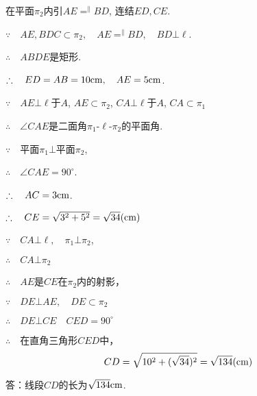 \begin{solution}
  在平面$\pi_2$内引$AE\displaystyle\mathop{=}^{\parallel}BD$, 连结$ED,CE$.

$\because\quad   AE,BDC\subset \pi_2,\quad AE\displaystyle\mathop{=}^{\parallel}BD,\quad BD\bot \ell$.

$\therefore\quad  ABDE$是矩形. 

$\therefore\quad ED=AB=10{\rm cm},\quad AE=5{\rm cm}$.

$\because\quad   AE\bot \ell$于$A$, $AE\subset \pi_2$, $CA\bot \ell$于$A$, $CA\subset \pi_1$

$\therefore\quad \angle CAE$是二面角$\pi_1$-$\ell$-$\pi_2$的平面角. 

$\because\quad $平面$\pi_1\bot$平面$\pi_2$,

$\therefore\quad\angle CAE=90^{\circ}$.

$\therefore\quad AC=3{\rm cm}$.

$\therefore\quad CE=\sqrt{3^2+5^2}=\sqrt{34}{\rm (cm)}$

$\because\quad CA\bot\ell,\quad \pi_1\bot \pi_2$,

$\therefore\quad CA\bot \pi_2$

$\therefore\quad AE$是$CE$在$\pi_2$内的射影，

$\because\quad DE\bot AE,\quad DE\subset \pi_2$

$\therefore\quad DE\bot CE\quad CED=90^{\circ}$

$\therefore\quad $在直角三角形$CED$中，
\[CD=\sqrt{10^2+(\sqrt{34})^2}=\sqrt{134}{\rm (cm)}\]

答：线段$CD$的长为$\sqrt{134}{\rm cm}$.
\end{solution}    

